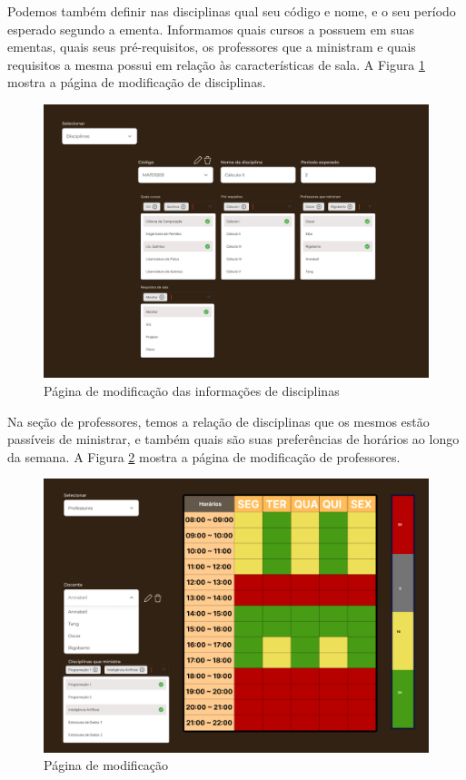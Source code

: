Podemos também definir nas disciplinas qual seu código e nome, e o seu período esperado segundo a ementa. Informamos quais cursos a possuem em suas ementas, quais seus pré-requisitos, os professores que a ministram e quais requisitos a mesma possui em relação às características de sala. A Figura \ref{fig:CRUD_disciplinas} mostra a página de modificação de disciplinas.

\begin{figure}[htbp]\centering
  \caption{\label{fig:CRUD_disciplinas} Página de modificação das informações de disciplinas}
  \includegraphics[scale=0.6]{files/img/Prototipo/Medio/CRUD_disciplinas.png}
\end{figure} %

Na seção de professores, temos a relação de disciplinas que os mesmos estão passíveis de ministrar, e também quais são suas preferências de horários ao longo da semana. A Figura \ref{fig:CRUD_professores} mostra a página de modificação de professores.

\begin{figure}[htbp]\centering
  \caption{\label{fig:CRUD_professores} Página de modificação}
  \includegraphics[scale=0.6]{files/img/Prototipo/Medio/CRUD_professores.png}
\end{figure} %

